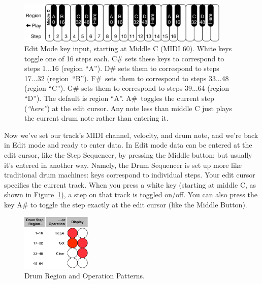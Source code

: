 \documentclass{article}
\begin{document}
\begin{figure}
\vspace{-0.5em}
\hspace{\fill}\includegraphics[width=4in]{EditModeKeys}
\vspace{-1em}
\caption{\small Edit Mode key input, starting at Middle C (MIDI 60).  White keys toggle one of 16 steps each.  C\# sets these keys to correspond to steps 1...16 (region ``A'').  D\# sets them to correspond to steps 17...32 (region~``B'').  F\#~sets them to correspond to steps 33...48 (region ``C'').  G\# sets them to correspond to steps 39...64 (region ``D'').  The default is region ``A''.  A\#~toggles the current step ({\it ``here''}) at the edit cursor.  Any note less than middle C just plays the current drum note rather than entering it.
 }
\label{editmodekeys}
\end{figure}

Now we've set our track's MIDI channel, velocity, and drum note, and we're back in Edit mode and ready to enter data.  In Edit mode data can be entered at the edit cursor, like the Step Sequencer, by pressing the Middle button; but usually it's entered in another way.  Namely, the Drum Sequencer is set up more like traditional drum machines: keys correspond to individual steps.  Your edit cursor specifies the current track.  When you press a white key (starting at middle C, as shown in Figure~\ref{editmodekeys}), a step on that track is toggled on/off.  You can also press the key A\# to toggle the step exactly at the edit cursor (like the Middle Button).  

\begin{figure}
\hspace{\fill}\includegraphics[width=1.3in]{drumregion}\hspace{\fill}%
\vspace{-1em}
\caption{\small Drum Region and Operation Patterns.}
\label{drumregionpatterns}
\end{figure}
\end{document}
